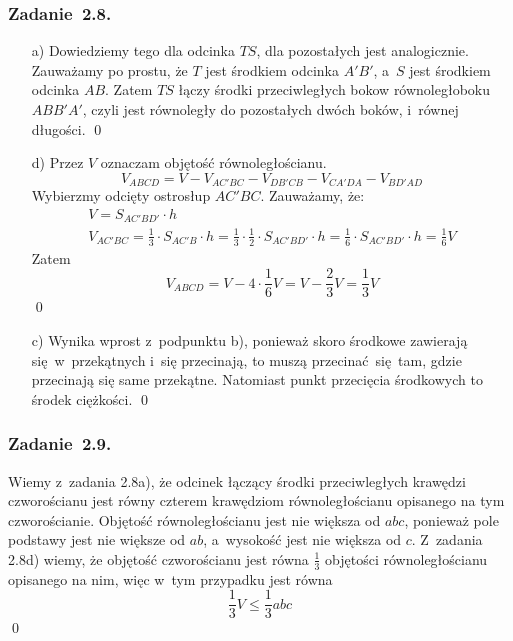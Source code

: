 \subsubsection*{Zadanie~2.8.}
\begin{itemize}
    \item[a)] Dowiedziemy tego dla odcinka \(TS\), dla pozostałych jest analogicznie. Zauważamy po prostu, że \(T\) jest środkiem odcinka \(A'B'\), a~\(S\) jest środkiem odcinka \(AB\). Zatem \(TS\) łączy środki przeciwległych bokow równoległoboku \(ABB'A'\), czyli jest równoległy do pozostałych dwóch boków, i~równej długości.
        \qed
    \item[d)] Przez \(V\) oznaczam objętość równoległościanu.
        \begin{equation*}
            V_{ABCD}
            = V - V_{AC'BC} - V_{DB'CB} - V_{CA'DA} - V_{BD'AD}
        \end{equation*}
        Wybierzmy odcięty ostrosłup \(AC'BC\). Zauważamy, że:
        \begin{gather*}
            V = S_{AC'BD'} \cdot h\\
            V_{AC'BC} = \frac{1}{3} \cdot S_{AC'B} \cdot h
            = \frac{1}{3} \cdot \frac{1}{2} \cdot S_{AC'BD'} \cdot h
            = \frac{1}{6} \cdot S_{AC'BD'} \cdot h
            = \frac{1}{6}V
        \end{gather*}
        Zatem
        \begin{equation*}
            V_{ABCD} = V - 4 \cdot \frac{1}{6}V
            = V - \frac{2}{3}V
            = \frac{1}{3}V
        \end{equation*}
        \qed
    \item[c)] Wynika wprost z~podpunktu b), ponieważ skoro środkowe zawierają się w~przekątnych i~się przecinają, to muszą przecinać się tam, gdzie przecinają się same przekątne. Natomiast punkt przecięcia środkowych to środek ciężkości.
        \qed
\end{itemize}
\subsubsection*{Zadanie~2.9.}
Wiemy z~zadania 2.8a), że odcinek łączący środki przeciwległych krawędzi czworościanu jest równy czterem krawędziom równoległościanu opisanego na tym czworościanie. Objętość równoległościanu jest nie większa od \(abc\), ponieważ pole podstawy jest nie większe od \(ab\), a~wysokość jest nie większa od \(c\). Z~zadania 2.8d) wiemy, że objętość czworościanu jest równa \(\frac{1}{3}\) objętości równoległościanu opisanego na nim, więc w~tym przypadku jest równa
\begin{equation*}
    \frac{1}{3}V \leq \frac{1}{3}abc
\end{equation*}
\qed
